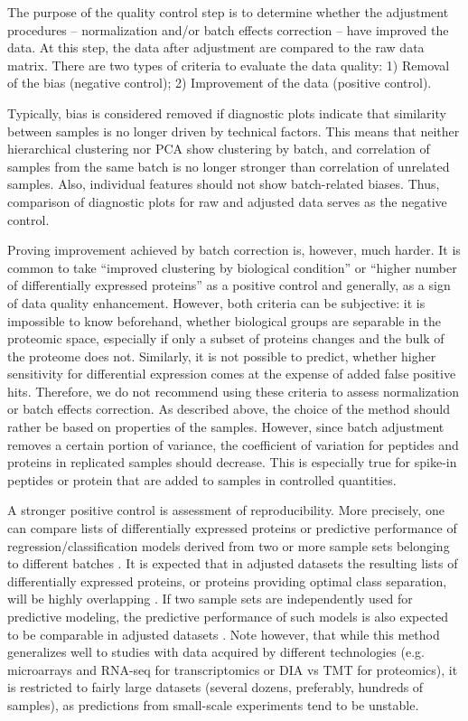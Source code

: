 \documentclass[num-refs]{wiley-article}
\begin{document}
The purpose of the quality control step is to determine whether the adjustment procedures – normalization and/or batch effects correction – have improved the data. At this step, the data after adjustment are compared to the raw data matrix. There are two types of criteria to evaluate the data quality: 1) Removal of the bias (negative control); 2) Improvement of the data (positive control).

Typically, bias is considered removed if diagnostic plots indicate that similarity between samples is no longer driven by technical factors. This means that neither hierarchical clustering nor PCA show clustering by batch, and correlation of samples from the same batch is no longer stronger than correlation of unrelated samples. Also, individual features should not show batch-related biases. Thus, comparison of diagnostic plots for raw and adjusted data serves as the negative control.

Proving improvement achieved by batch correction is, however, much harder. It is common to take “improved clustering by biological condition” or “higher number of differentially expressed proteins” as a positive control and generally, as a sign of data quality enhancement. However, both criteria can be subjective: it is impossible to know beforehand, whether biological groups are separable in the proteomic space, especially if only a subset of proteins changes and the bulk of the proteome does not. Similarly, it is not possible to predict, whether higher sensitivity for differential expression comes at the expense of added false positive hits. Therefore, we do not recommend using these criteria to assess normalization or batch effects correction. As described above, the choice of the method should rather be based on properties of the samples. However, since batch adjustment removes a certain portion of variance, the coefficient of variation for peptides and proteins in replicated samples should decrease. This is especially true for spike-in peptides or protein that are added to samples in controlled quantities. 

A stronger positive control is assessment of reproducibility. More precisely, one can compare lists of differentially expressed proteins or predictive performance of regression/classification models derived from two or more sample sets belonging to different batches \cite{Lazar:2013aa}. It is expected that in adjusted datasets the resulting lists of differentially expressed proteins, or proteins providing optimal class separation, will be highly overlapping \cite{Shabalin:2008aa}. If two sample sets are independently used for predictive modeling, the predictive performance of such models is also expected to be comparable in adjusted datasets \cite{Luo2010}. Note however, that while this method generalizes well to studies with data acquired by different technologies (e.g. microarrays and RNA-seq for transcriptomics or DIA vs TMT for proteomics), it is restricted to fairly large datasets (several dozens, preferably, hundreds of samples), as predictions from small-scale experiments tend to be unstable.
 
\end{document}
